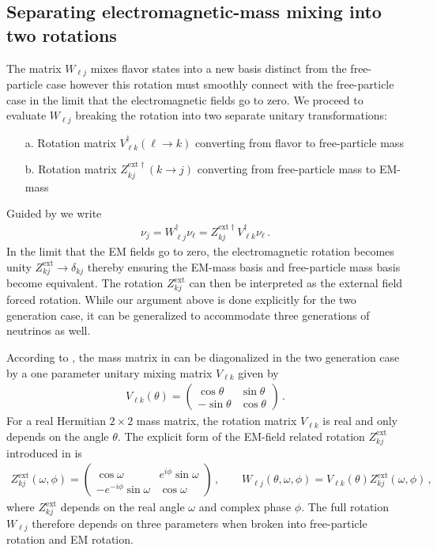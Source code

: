 \subsection{Separating electromagnetic-mass mixing into two rotations}
\label{sec:zmixing}
The matrix $W_{\ell j}$ mixes flavor states into a new basis distinct from the free-particle case however this rotation must smoothly connect with the free-particle case in the limit that the electromagnetic fields go to zero. We proceed to evaluate $W_{\ell j}$ breaking the rotation into two separate unitary transformations:
\begin{itemize}[nosep]
    \item [a.] Rotation matrix $V_{\ell k}^{\dag}(\ell\rightarrow k)$ converting from flavor to free-particle mass
    \item [b.] Rotation matrix $Z_{kj}^{\mathrm{ext}\dag}(k\rightarrow j)$ converting from free-particle mass to EM-mass
\end{itemize}
Guided by  we write
\begin{align}
\label{zrot:1}
\nu_{j} = W^{\dag}_{\ell j}\nu_{\ell} = Z_{kj}^{\mathrm{ext}\dag}V_{\ell k}^{\dag}\nu_{\ell}\,.
\end{align}
In the limit that the EM fields go to zero, the electromagnetic rotation becomes unity $Z_{kj}^\mathrm{ext}\rightarrow\delta_{kj}$ thereby ensuring the EM-mass basis and free-particle mass basis become equivalent. The rotation $Z_{kj}^\mathrm{ext}$ can then be interpreted as the external field forced rotation. While our argument above is done explicitly for the two generation case, it can be generalized to accommodate three generations of neutrinos as well.

According to , the mass matrix in  can be diagonalized in the two generation case by a one parameter unitary mixing matrix $V_{\ell k}$ given by
\begin{align}
\label{rot:1}
V_{\ell k}(\theta)=
\begin{pmatrix}
\cos\theta & \sin\theta\\
-\sin\theta & \cos\theta
\end{pmatrix}\,.
\end{align}
For a real Hermitian $2\times 2$ mass matrix, the rotation matrix $V_{\ell k}$ is real and only depends on the angle $\theta$. The explicit form of the EM-field related rotation $Z_{kj}^\mathrm{ext}$ introduced in  is
\begin{align}
\label{zrot:2}
Z_{kj}^\mathrm{ext}(\omega,\phi)=
\begin{pmatrix}
\cos\omega & e^{i\phi}\sin\omega\\
-e^{-i\phi}\sin\omega & \cos\omega
\end{pmatrix}\,,\qquad
W_{\ell j}(\theta,\omega,\phi)=V_{\ell k}(\theta)Z_{kj}^\mathrm{ext}(\omega,\phi)\,,
\end{align}
where $Z_{kj}^\mathrm{ext}$ depends on the real angle $\omega$ and complex phase $\phi$. The full rotation $W_{\ell j}$ therefore depends on three parameters when broken into free-particle rotation and EM rotation.

